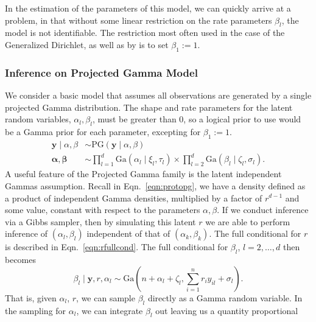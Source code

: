 In the estimation of the parameters of this model, we can quickly arrive at a problem, in that
  without some linear restriction on the rate parameters $\beta_l$, the model is not identifiable.
  The restriction most often used in the case of the Generalized Dirichlet, as well as by
  \cite{nunez2019} is to set $\beta_1 := 1$.

\subsubsection{Inference on Projected Gamma Model}
We consider a basic model that assumes all observations are generated by a single projected Gamma
  distribution.  The shape and rate parameters for the latent  random variables,
  $\alpha_l,\beta_l$, must be greater than 0, so a logical prior to use would be a Gamma prior for
  each parameter, excepting for $\beta_1 := 1$.
  \begin{equation}
    \label{eqn:vanillap}
    \begin{aligned}
      \bm{ y}\mid\alpha,\beta &\sim \text{PG}(\bm{ y}\mid\alpha,\beta)\\
      \bm{ \alpha},\bm{\beta} &\sim {\textstyle \prod}_{l = 1}^d \text{Ga}(\alpha_l \mid \xi_l,\tau_l)
              \times {\textstyle \prod}_{l = 2}^d \text{Ga}(\beta_l\mid \zeta_l,\sigma_l).
    \end{aligned}
  \end{equation}
  A useful feature of the Projected Gamma family is the latent independent Gammas assumption.  Recall
  in Eqn.~\ref{eqn:protopg}, we have a density defined as a product of independent Gamma densities,
  multiplied by a factor of $r^{d-1}$ and some value, constant with respect to the parameters
  $\alpha,\beta$.  If we conduct inference via a Gibbs sampler, then by simulating this latent $r$
  we are able to perform inference of $(\alpha_l,\beta_l)$ independent of that of $(\alpha_k,\beta_k)$.
  The full conditional for $r$ is described in Eqn.~\ref{eqn:rfullcond}.  The full conditional for
  $\beta_l$, $l = 2,\ldots,d$ then becomes
  \begin{equation}
    \label{eqn:betafc}
    \beta_l\mid \bm{ y}, r, \alpha_l \sim \text{Ga}\left(n + \alpha_l + \zeta_l,
                                      {\textstyle \sum}_{i = 1}^nr_iy_{il} + \sigma_l\right).
  \end{equation}
  That is, given $\alpha_l$, $r$, we can sample $\beta_l$ directly as a Gamma random variable.  In
  the sampling for $\alpha_l$, we can integrate $\beta_l$ out leaving us a quantity proportional
